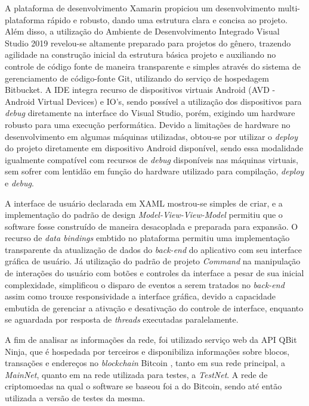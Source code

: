 \documentclass[
	article,			%
	11pt,				%
	oneside,			%
	a4paper,			%
	chapter=TITLE,		%
	section=TITLE,		%
	subsection=TITLE,	%
	subsubsection=TITLE, %
	english,			%
	brazil,				%
	sumario=tradicional
	]{ifrs-artigo-abntex2}
\begin{document}
A plataforma de desenvolvimento Xamarin propiciou um desenvolvimento multi-plataforma rápido e robusto, dando uma estrutura clara e concisa ao projeto. Além disso, a utilização do Ambiente de Desenvolvimento Integrado Visual Studio 2019 revelou-se altamente preparado para projetos do gênero, trazendo agilidade na construção inicial da estrutura básica projeto e auxiliando no controle de código fonte de maneira transparente e simples através do sistema de gerenciamento de código-fonte Git, utilizando do serviço de hospedagem Bitbucket. A IDE integra recurso de dispositivos virtuais Android (AVD - Android Virtual Devices) e IO's, sendo possível a utilização dos dispositivos para \textit{debug} diretamente na interface do Visual Studio, porém, exigindo um hardware robusto para uma execução performática. Devido a limitações de hardware no desenvolvimento em algumas máquinas utilizadas, obtou-se por utilizar o \textit{deploy} do projeto diretamente em dispositivo Android disponível, sendo essa modalidade igualmente compatível com recursos de \textit{debug} disponíveis nas máquinas virtuais, sem sofrer com lentidão em função do hardware utilizado para compilação, \textit{deploy} e \textit{debug}.


A interface de usuário declarada em XAML mostrou-se simples de criar, e a implementação do padrão de design \textit{Model-View-View-Model} permitiu que o software fosse construído de maneira desacoplada e preparada para expansão. O recurso de \textit{data bindings} embtido no plataforma permitiu uma implementação transparente da atualização de dados do \textit{back-end} do aplicativo com seu interface gráfica de usuário. Já utilização do padrão de projeto \textit{Command} na manipulação de interações do usuário com botões e controles da interface a pesar de sua inicial complexidade, simplificou o disparo de eventos a serem tratados no \textit{back-end} assim como trouxe responsividade a interface gráfica, devido a capacidade embutida de gerenciar a ativação e desativação do controle de interface, enquanto se aguardada por resposta de \textit{threads} executadas paralelamente.


A fim de analisar as informações da rede, foi utilizado serviço web da API QBit Ninja, que é hospedada por terceiros e disponibiliza informações sobre blocos, transações e endereços no \textit{blockchain} Bitcoin \cite{progblockC}, tanto em sua rede principal, a \textit{MainNet}, quanto em na rede utilizada para testes, a \textit{TestNet}.
A rede de criptomoedas na qual o software se baseou foi a do Bitcoin, sendo até então utilizada a versão de testes da mesma.
\end{document}
